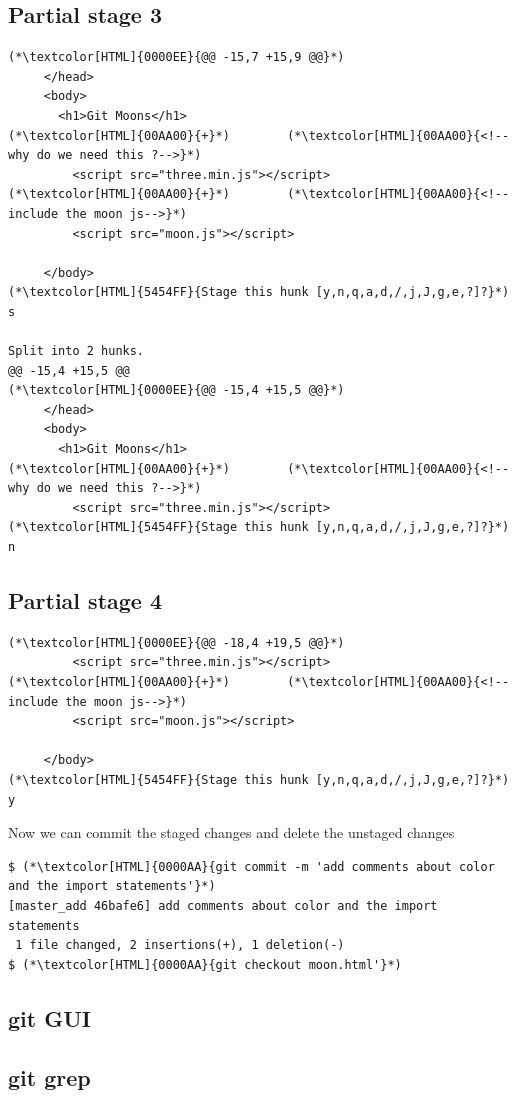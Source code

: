\subsection{Partial stage 3}
\begin{frame}[fragile]
  \subslidetitle

 \begin{lstlisting}
(*\textcolor[HTML]{0000EE}{@@ -15,7 +15,9 @@}*)
     </head>
     <body>
       <h1>Git Moons</h1>
(*\textcolor[HTML]{00AA00}{+}*)        (*\textcolor[HTML]{00AA00}{<!--why do we need this ?-->}*)
         <script src="three.min.js"></script>
(*\textcolor[HTML]{00AA00}{+}*)        (*\textcolor[HTML]{00AA00}{<!--include the moon js-->}*)
         <script src="moon.js"></script>

     </body>
(*\textcolor[HTML]{5454FF}{Stage this hunk [y,n,q,a,d,/,j,J,g,e,?]?}*) s

Split into 2 hunks.
@@ -15,4 +15,5 @@
(*\textcolor[HTML]{0000EE}{@@ -15,4 +15,5 @@}*)
     </head>
     <body>
       <h1>Git Moons</h1>
(*\textcolor[HTML]{00AA00}{+}*)        (*\textcolor[HTML]{00AA00}{<!--why do we need this ?-->}*)
         <script src="three.min.js"></script>
(*\textcolor[HTML]{5454FF}{Stage this hunk [y,n,q,a,d,/,j,J,g,e,?]?}*) n
 \end{lstlisting}
\end{frame}

\subsection{Partial stage 4}
\begin{frame}[fragile]
  \subslidetitle

 \begin{lstlisting}
(*\textcolor[HTML]{0000EE}{@@ -18,4 +19,5 @@}*)
         <script src="three.min.js"></script>
(*\textcolor[HTML]{00AA00}{+}*)        (*\textcolor[HTML]{00AA00}{<!--include the moon js-->}*)
         <script src="moon.js"></script>

     </body>
(*\textcolor[HTML]{5454FF}{Stage this hunk [y,n,q,a,d,/,j,J,g,e,?]?}*) y
 \end{lstlisting}

 Now we can commit the staged changes and delete the unstaged changes

 \begin{lstlisting}
$ (*\textcolor[HTML]{0000AA}{git commit -m 'add comments about color and the import statements'}*)
[master_add 46bafe6] add comments about color and the import statements
 1 file changed, 2 insertions(+), 1 deletion(-)
$ (*\textcolor[HTML]{0000AA}{git checkout moon.html'}*)
 \end{lstlisting}
\end{frame}

\subsection{git GUI}
\begin{frame}[fragile]
  \subslidetitle
\end{frame}

\subsection{git grep}
\begin{frame}[fragile]
  \subslidetitle
\end{frame}

